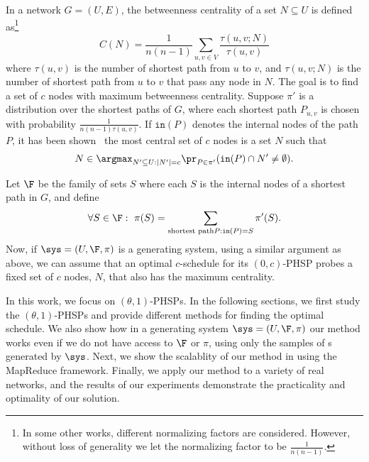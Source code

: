 \begin{itemize}
 In a network $G=(U,E)$, the betweenness centrality of a set $N\subseteq U$ is defined as\footnote{In some other works, different normalizing factors are considered. However, without loss of generality we let the normalizing factor to be $\frac{1}{n(n-1)}$.}
 $$C(N) = \frac{1}{n(n-1)}\sum_{u,v\in V} \frac{\tau(u,v; N)}{\tau(u,v)}$$
 where $\tau(u,v)$ is the number of shortest path from $u$ to $v$, and $\tau(u,v;N)$ is the number of shortest path from $u$ to $v$ that pass any node in $N$. The goal is to find a set of $c$ nodes with maximum betweenness centrality. Suppose $\pi'$ is a distribution over the shortest paths of $G$, where each shortest path $P_{u,v}$ is chosen with probability $\frac{1}{n(n-1)\tau(u,v)}$. If $\texttt{in}(P)$ denotes the internal nodes of the path $P$, it has been shown~\cite{yoshida2014almost,mattoe?} the most central set of $c$ nodes is a set $N$ such that 
 $$N\in \argmax_{N'\subseteq U: |N'|=c} \pr_{P\in\pi'}(\texttt{in}(P)\cap N' \neq \emptyset).$$
 
 
Let $\F$ be the family of sets $S$ where each $S$ is the internal nodes of a shortest path in $G$, and define 
 $$\forall S\in\F : \ \pi(S)=\sum_{\text{shortest path} P: \texttt{in}(P)=S} \pi'(S).$$
Now, if $\sys=(U,\F,\pi)$ is a generating system, using a similar argument as above, we can assume that an optimal $c$-schedule for its $(0,c)$-PHSP probes a fixed set of $c$ nodes, $N$, that also has the maximum centrality.
\end{itemize}

In this work, we focus on $(\theta,1)$-PHSPs. In the following sections, we first study the $(\theta,1)$-PHSPs and provide different methods for finding the optimal schedule. We also show how in a generating system $\sys=(U,\F,\pi)$ our method works even if we do not have access to $\F$ or $\pi$, using only the samples of {\ins}s generated by $\sys$. Next, we show the scalablity of our method in using the MapReduce framework. Finally, we apply our method to a variety of real networks, and the results of our experiments demonstrate the practicality and optimality of our solution. 



